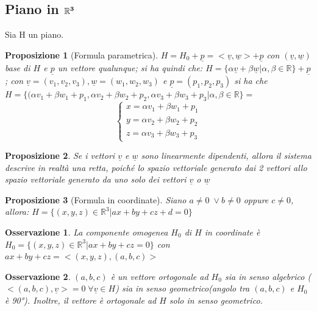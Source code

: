 \documentclass[12pt]{article}
\newenvironment{para}{\begin{adjustwidth}{13mm}{}}{\end{adjustwidth}}
\newtheorem{Proposizione}{Proposizione}[subsection]
\newtheorem{Osservazione}{Osservazione}[subsection]
\begin{document}
\begin{para}
\subsection{Piano in $\bold{\mathbb{R}^3}$}
Sia H un piano.
\begin{Proposizione}[Formula parametrica]
    $H = H_0 + \underline{p} = <\underline{v}, \underline{w}> + \underline{p}$ con $(\underline{v}, \underline{w})$ base di $H$ e $\underline{p}$ un vettore qualunque; si ha quindi che: \newline
    $H = \{\alpha\underline{v} + \beta\underline{w} | \alpha, \beta \in \mathbb{R}\} + \underline{p}$; con $\underline{v} = (v_1,v_2,v_3), \underline{w} = (w_1, w_2, w_3)$ e $\underline{p} = (p_1, p_2, p_3)$ si ha che $H = \{(\alpha v_1 + \beta w_1 + p_1, \alpha v_2 + \beta w_2 + p_2, \alpha v_3 + \beta w_3 + p_3| \alpha, \beta \in \mathbb{R}\} = $ $$\begin{cases}
        x = \alpha v_1 + \beta w_1 + p_1 \\
        y = \alpha v_2 + \beta w_2 + p_2 \\
        z = \alpha v_3 + \beta w_3 + p_3
    \end{cases}$$
\end{Proposizione}
\begin{Proposizione}
    Se i vettori $\underline{v}$ e $\underline{w}$ sono linearmente dipendenti, allora il sistema descrive in realtà una retta, poiché lo spazio vettoriale generato dai 2 vettori allo spazio vettoriale generato da uno solo dei vettori $\underline{v}$ o $\underline{w}$
\end{Proposizione}
\begin{Proposizione}[Formula in coordinate] Siano $a \neq 0 \; \lor b \neq 0 $ oppure $c \neq 0$, allora:
$H = \{(x,y,z)\in \mathbb{R}^3 | ax+by+cz+d= 0\}$
\end{Proposizione}
\begin{Osservazione}
    La componente omogenea $H_0$ di $H$ in coordinate è \newline $H_0 = \{(x,y,z)\in \mathbb{R}^3 | ax+by+cz = 0\}$ con $ax+by+cz = <(x,y,z),(a,b,c)>$
\end{Osservazione}
\begin{Osservazione}
    $(a,b,c)$ è un vettore ortogonale ad $H_0$ sia in senso algebrico ($<(a,b,c), \underline{v}> = 0 \; \forall \underline{v} \in H$) sia in senso geometrico(angolo tra $(a,b,c)$ e $H_0$ è 90°). Inoltre, il vettore è ortogonale ad $H$ solo in senso geometrico.
\end{Osservazione}

\end{para}
\end{document}
